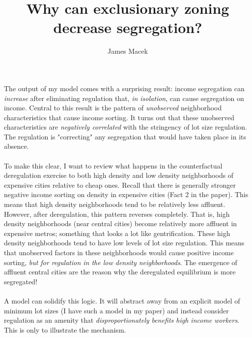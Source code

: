 \documentclass[]{article}
\title{Why can exclusionary zoning decrease segregation?}
\author{James Macek}
\begin{document}
\maketitle

\section*{}
\paragraph*{}
The output of my model comes with a surprising result: income segregation can \textit{increase} after eliminating regulation that, \textit{in isolation}, can cause segregation on income. Central to this result is the pattern of \textit{unobserved} neighborhood characteristics that cause income sorting. It turns out that these unobserved characteristics are \textit{negatively correlated} with the stringency of lot size regulation. The regulation is "correcting" any segregation that would have taken place in its absence. 
\paragraph*{}
To make this clear, I want to review what happens in the counterfactual deregulation exercise to both high density and low density neighborhoods of expensive cities relative to cheap ones. Recall that there is generally stronger negative income sorting on density in expensive cities (Fact 2 in the paper). This means that high density neighborhoods tend to be relatively less affluent. However, after deregulation, this pattern reverses completely. That is, high density neighborhoods (near central cities) become relatively more affluent in expensive metros; something that looks a lot like gentrification. These high density neighborhoods tend to have low levels of lot size regulation. This means that unobserved factors in these neighborhoods would cause positive income sorting, \textit{but for regulation in the low density neighborhoods}.  The emergence of affluent central cities are the reason why the deregulated equilibrium is more segregated!

\paragraph*{}
A model can solidify this logic. It will abstract away from an explicit model of minimum lot sizes (I have such a model in my paper) and instead consider regulation as an amenity that \textit{disproportionately benefits high income workers}. This is only to illustrate the mechanism. 
\end{document}
